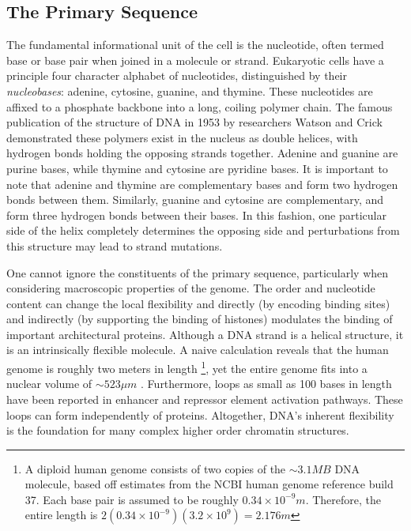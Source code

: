 \documentclass[phd,tocprelim]{cornell}
\begin{document}
\subsection{The Primary Sequence}

The fundamental informational unit of the cell is the nucleotide, often
termed base or base pair when joined in a molecule or strand.  Eukaryotic
cells have a principle four character alphabet of nucleotides, distinguished
by their \textit{nucleobases}: adenine, cytosine, guanine, and thymine.  These
nucleotides are affixed to a phosphate backbone into a long, coiling polymer
chain.  The famous publication of the structure of DNA in 1953 by researchers
Watson and Crick demonstrated these polymers exist in the nucleus as double
helices\cite{watson1953}, with hydrogen bonds holding the opposing strands
together.  Adenine and guanine are purine bases, while thymine and cytosine are
pyridine bases.  It is important to note that adenine and thymine are
complementary bases and form two hydrogen bonds between them.  Similarly,
guanine and cytosine are complementary, and form three hydrogen bonds between
their bases.  In this fashion, one particular side of the helix completely
determines the opposing side and perturbations from this structure may lead
to strand mutations\cite{cox2008}.

One cannot ignore the constituents of the primary sequence, particularly when
considering macroscopic properties of the genome.  The order and
nucleotide content can change the local flexibility and directly (by
encoding binding sites) and indirectly (by supporting the binding of histones)
modulates the binding of important architectural proteins\cite{travers2004}.
Although a DNA strand is a helical structure, it is an intrinsically
flexible molecule.  A naive calculation reveals that the human genome is
roughly two meters in length%
\footnote{%
  A diploid human genome consists of two copies of the $\sim3.1MB$ DNA molecule,
  based off estimates from the NCBI human genome reference build 37.
  Each base pair is assumed to be roughly $0.34\times10^{-9}m$.  Therefore, the
  entire length is $2(0.34 \times 10^{-9})(3.2 \times 10^9) = 2.176m$
},
yet the entire genome fits into a nuclear volume of $\sim523\mu{}m$
\cite{marks2011}.  Furthermore, loops as small as 100 bases in length have been
reported in enhancer and repressor element activation pathways\cite{wong2008}.
These loops can form independently of proteins\cite{vafabakhsh2012}.  Altogether, DNA's
inherent flexibility is the foundation for  many complex higher order
chromatin structures.
\end{document}
